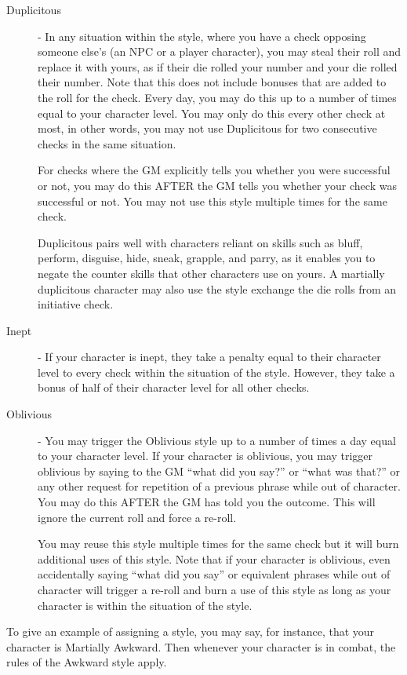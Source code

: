 \begin{description}
\item[Duplicitous] - In any situation within the style, where you have a check opposing someone else’s (an NPC or a player character), you may steal their roll and replace it with yours, as if their die rolled your number and your die rolled their number. Note that this does not include bonuses that are added to the roll for the check. Every day, you may do this up to a number of times equal to your character level. You may only do this every other check at most, in other words, you may not use Duplicitous for two consecutive checks in the same situation.

For checks where the GM explicitly tells you whether you were successful or not, you may do this AFTER the GM tells you whether your check was successful or not. You may not use this style multiple times for the same check.

Duplicitous pairs well with characters reliant on skills such as bluff, perform, disguise, hide, sneak, grapple, and parry, as it enables you to negate the counter skills that other characters use on yours. A martially duplicitous character may also use the style exchange the die rolls from an initiative check.

\item[Inept] - If your character is inept, they take a penalty equal to their character level to every check within the situation of the style. However, they take a bonus of half of their character level for all other checks.

\item[Oblivious] - You may trigger the Oblivious style up to a number of times a day equal to your character level. If your character is oblivious, you may trigger oblivious by saying to the GM “what did you say?” or “what was that?” or any other request for repetition of a previous phrase while out of character. You may do this AFTER the GM has told you the outcome. This will ignore the current roll and force a re-roll.

You may reuse this style multiple times for the same check but it will burn additional uses of this style. Note that if your character is oblivious, even accidentally saying “what did you say” or equivalent phrases while out of character will trigger a re-roll and burn a use of this style as long as your character is within the situation of the style.
\end{description}

To give an example of assigning a style, you may say, for instance, that your character is Martially Awkward. Then whenever your character is in combat, the rules of the Awkward style apply.
